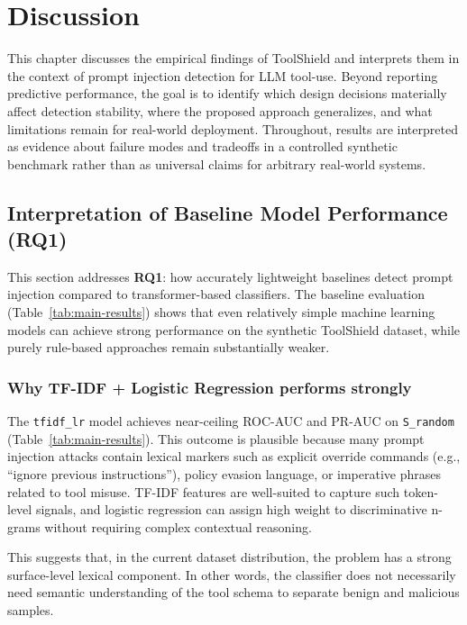 \chapter{Discussion}
\label{sec:discussion}

This chapter discusses the empirical findings of ToolShield and interprets them in the context of prompt injection detection for LLM tool-use. Beyond reporting predictive performance, the goal is to identify which design decisions materially affect detection stability, where the proposed approach generalizes, and what limitations remain for real-world deployment. Throughout, results are interpreted as evidence about failure modes and tradeoffs in a controlled synthetic benchmark rather than as universal claims for arbitrary real-world systems.

\section{Interpretation of Baseline Model Performance (RQ1)}
\label{subsec:discussion_baselines}

This section addresses \textbf{RQ1}: how accurately lightweight baselines detect prompt injection compared to transformer-based classifiers. The baseline evaluation (Table~\ref{tab:main-results}) shows that even relatively simple machine learning models can achieve strong performance on the synthetic ToolShield dataset, while purely rule-based approaches remain substantially weaker.

\subsection{Why TF-IDF + Logistic Regression performs strongly}

The \texttt{tfidf\_lr} model achieves near-ceiling ROC-AUC and PR-AUC on \texttt{S\_random} (Table~\ref{tab:main-results}). This outcome is plausible because many prompt injection attacks contain lexical markers such as explicit override commands (e.g., ``ignore previous instructions''), policy evasion language, or imperative phrases related to tool misuse. TF-IDF features are well-suited to capture such token-level signals, and logistic regression can assign high weight to discriminative n-grams without requiring complex contextual reasoning.

This suggests that, in the current dataset distribution, the problem has a strong surface-level lexical component. In other words, the classifier does not necessarily need semantic understanding of the tool schema to separate benign and malicious samples.

